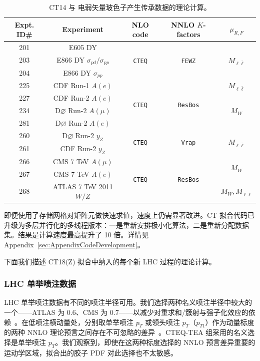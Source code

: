 \begin{table}[tb]
\begin{tabular}{|c|c|c|c|c| }
\hline
Expt. ID\# & Experiment   &  NLO code &  NNLO $K$-factors  & $\mu_{R,F}$\\
\hline
201 &  E605 DY  &  \multirow{3}{*}{ \texttt{CTEQ}}  & \multirow{3}{*}{ \texttt{FEWZ}  }   & \multirow{3}{*}{$M_{\ell \bar \ell}$} \\
203  & E866 DY $\sigma_{pd}/\sigma_{pp}$  &  &    & \\
204  & E866 DY $\sigma_{pp}$  &  &    & \\
\hline
225 & CDF Run-1 $A(e)$  &  \multirow{4}{*}{ \texttt{CTEQ}}  &  \multirow{4}{*}{ \texttt{ResBos}}  &  $M_{\ell \bar \ell}$   \\
227 & CDF Run-2 $A(e)$ &     &  &  \multirow{3}{*}{$M_{W}$} \\
234 &  D$\varnothing$ Run-2 $A(\mu)$  &    && \\
281 & D$\varnothing$ Run-2 $A(e)$  &   &&  \\
\hline
260 &   D$\varnothing$ Run-2 $y_{Z}$ &   \multirow{2}{*}{ \texttt{CTEQ}}  &  \multirow{2}{*}{\texttt{Vrap}}  &
\multirow{2}{*}{ $M_{\ell \bar \ell}$ } \\
261 &  CDF Run-2 $y_{Z}$ &        &  &\\
\hline
266 & CMS 7 TeV $A(\mu)$   &   \multirow{3}{*}{\texttt{CTEQ} }  &\multirow{3}{*}{ \texttt{ResBos}} & \multirow{2}{*}{ $M_{W}$}   \\
267  & CMS 7 TeV $A(e)$  &        &  &\\
268 &  ATLAS 7 TeV 2011 $W/Z$  &   &   & $M_{W},M_{\ell \bar \ell}$ \\
\hline
\end{tabular}
\caption{CT14 与 \CTHERAII{} 电弱矢量玻色子产生传承数据的理论计算。
\label{Theory-Calc-VB}}
\end{table}

即便使用了存储网格对矩阵元做快速求值，速度上仍需显著改进。CT 拟合代码已升级为多层并行化的多线程版本：一是重新安排极小化算法，二是重新分配数据集。结果是计算速度最高提升了 10 倍。详情见
Appendix~\ref{sec:AppendixCodeDevelopment}。

下面我们描述 CT18(Z) 拟合中纳入的每个新 LHC 过程的理论计算。

\subsubsection{LHC 单举喷注数据
\label{sec:TheoryJets}
}

LHC 单举喷注数据有不同的喷注半径可用。我们选择两种名义喷注半径中较大的一个——ATLAS 为 0.6、CMS 为 0.7——以减少对重求和/簇射与强子化效应的依赖~\cite{Bellm:2019yyh}。在低喷注横动量处，分别取单举喷注 $p_T$ 或领头喷注 $p_T$（$p_{T1}$）作为动量标度的两种 NNLO 理论预言之间存在不可忽略的差异~\cite{Currie:2018xkj}。CTEQ-TEA 组采用的名义选择是单举喷注 $p_T$。我们观察到，即使在这两种标度选择的 NNLO 预言差异重要的运动学区域，拟合出的胶子 PDF 对此选择也不太敏感。

